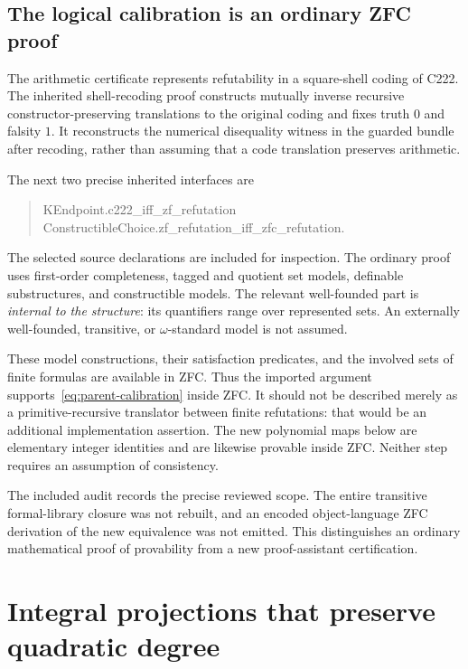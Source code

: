 \documentclass[10pt,letterpaper]{article}
\theoremstyle{definition}\newtheorem{definition}[theorem]{Definition}
\begin{document}
\subsection{The logical calibration is an ordinary ZFC proof}
\label{sec:logical}
The arithmetic certificate represents refutability in a square-shell
coding of C222. The inherited shell-recoding proof constructs mutually
inverse recursive constructor-preserving translations to the original
coding and fixes truth $0$ and falsity $1$. It reconstructs the numerical
disequality witness in the guarded bundle after recoding, rather than
assuming that a code translation preserves arithmetic.

The next two precise inherited interfaces are
\begin{quote}\small\ttfamily
KEndpoint.c222\_iff\_zf\_refutation\\
ConstructibleChoice.zf\_refutation\_iff\_zfc\_refutation.
\end{quote}
The selected source declarations are included for inspection. The ordinary
proof uses first-order completeness, tagged and quotient set models,
definable substructures, and constructible models. The relevant
well-founded part is \emph{internal to the structure}: its quantifiers range
over represented sets. An externally well-founded, transitive, or
$\omega$-standard model is not assumed.

These model constructions, their satisfaction predicates, and the involved
sets of finite formulas are available in ZFC. Thus the imported argument
supports~\eqref{eq:parent-calibration} inside ZFC. It should not be described
merely as a primitive-recursive translator between finite refutations:
that would be an additional implementation assertion. The new polynomial
maps below are elementary integer identities and are likewise provable
inside ZFC. Neither step requires an assumption of consistency.

The included audit records the precise reviewed scope. The entire
transitive formal-library closure was not rebuilt, and an encoded
object-language ZFC derivation of the new equivalence was not emitted.
This distinguishes an ordinary mathematical proof of provability from a
new proof-assistant certification.

\section{Integral projections that preserve quadratic degree}
\label{sec:projection}
\end{document}
